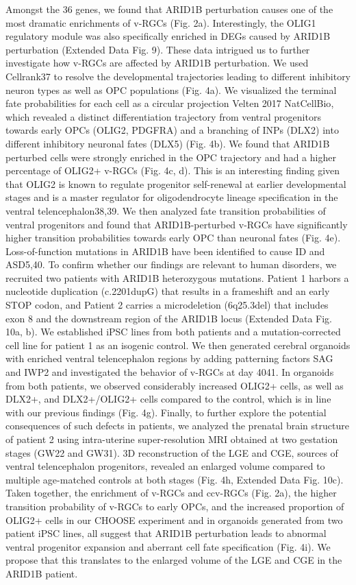 Amongst the 36 genes, we found that ARID1B perturbation causes one of the most dramatic enrichments of v-RGCs (Fig. 2a). Interestingly, the OLIG1 regulatory module was also specifically enriched in DEGs caused by ARID1B perturbation (Extended Data Fig. 9). These data intrigued us to further investigate how v-RGCs are affected by ARID1B perturbation. We used Cellrank37 to resolve the developmental trajectories leading to different inhibitory neuron types as well as OPC populations (Fig. 4a). We visualized the terminal fate probabilities for each cell as a circular projection {Velten 2017 NatCellBio}, which revealed a distinct differentiation trajectory from ventral progenitors towards early OPCs (OLIG2, PDGFRA) and a branching of INPs (DLX2) into different inhibitory neuronal fates (DLX5) (Fig. 4b). We found that ARID1B perturbed cells were strongly enriched in the OPC trajectory and had a higher percentage of OLIG2+ v-RGCs (Fig. 4c, d). This is an interesting finding given that OLIG2 is known to regulate progenitor self-renewal at earlier developmental stages and is a master regulator for oligodendrocyte lineage specification in the ventral telencephalon38,39. We then analyzed fate transition probabilities of ventral progenitors and found that ARID1B-perturbed v-RGCs have significantly higher transition probabilities towards early OPC than neuronal fates (Fig. 4e).
Loss-of-function mutations in ARID1B have been identified to cause ID and ASD5,40. To confirm whether our findings are relevant to human disorders, we recruited two patients with ARID1B heterozygous mutations. Patient 1 harbors a nucleotide duplication (c.2201dupG) that results in a frameshift and an early STOP codon, and Patient 2 carries a microdeletion (6q25.3del) that includes exon 8 and the downstream region of the ARID1B locus (Extended Data Fig. 10a, b). We established iPSC lines from both patients and a mutation-corrected cell line for patient 1 as an isogenic control. We then generated cerebral organoids with enriched ventral telencephalon regions by adding patterning factors SAG and IWP2 and investigated the behavior of v-RGCs at day 4041. In organoids from both patients, we observed considerably increased OLIG2+ cells, as well as DLX2+, and DLX2+/OLIG2+ cells compared to the control, which is in line with our previous findings (Fig. 4g). Finally, to further explore the potential consequences of such defects in patients, we analyzed the prenatal brain structure of patient 2 using intra-uterine super-resolution MRI obtained at two gestation stages (GW22 and GW31). 3D reconstruction of the LGE and CGE, sources of ventral telencephalon progenitors, revealed an enlarged volume compared to multiple age-matched controls at both stages (Fig. 4h, Extended Data Fig. 10c). Taken together, the enrichment of v-RGCs and ccv-RGCs (Fig. 2a), the higher transition probability of v-RGCs to early OPCs, and the increased proportion of OLIG2+ cells in our CHOOSE experiment and in organoids generated from two patient iPSC lines, all suggest that ARID1B perturbation leads to abnormal ventral progenitor expansion and aberrant cell fate specification (Fig. 4i). We propose that this translates to the enlarged volume of the LGE and CGE in the ARID1B patient.
